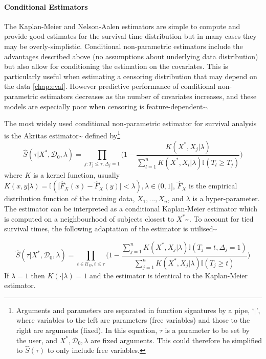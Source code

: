 \documentclass[
  letterpaper,
]{scrbook}
\let\oldparagraph\paragraph
\renewcommand{\paragraph}[1]{\oldparagraph{#1}\mbox{}}
\theoremstyle{plain}
\theoremstyle{definition}
\theoremstyle{remark}
\begin{document}
\paragraph{Conditional Estimators}

The Kaplan-Meier and Nelson-Aalen estimators are simple to compute and
provide good estimates for the survival time distribution but in many
cases they may be overly-simplistic. Conditional non-parametric
estimators include the advantages described above (no assumptions about
underlying data distribution) but also allow for conditioning the
estimation on the covariates. This is particularly useful when
estimating a censoring distribution that may depend on the data
\ref{chap:eval}. However predictive performance of conditional
non-parametric estimators decreases as the number of covariates
increases, and these models are especially poor when censoring is
feature-dependent\textasciitilde{}\cite{Gerds2006}.

The most widely used conditional non-parametric estimator for survival
analysis is the Akritas estimator\textasciitilde{}\cite{Akritas1994}
defined
by\footnote{Arguments and parameters are separated in function signatures by a pipe, `$|$', where variables to the left are parameters (free variables) and those to the right are arguments (fixed). In this equation, $\tau$ is a parameter to be set by the user, and $X^*, \mathcal{D}_0, \lambda$ are fixed arguments. This could therefore be simplified to $\hat{S}(\tau)$ to only include free variables.}
\[
\hat{S}(\tau|X^*, \mathcal{D}_0, \lambda) = \prod_{j:T_j \leq \tau, \Delta_j = 1} \Big(1 - \frac{K(X^*, X_j|\lambda)}{\sum_{l = 1}^n K(X^*, X_l|\lambda)\mathbb{I}(T_l \geq T_j)}\Big)
\] where \(K\) is a kernel function, usually
\(K(x,y|\lambda) = \mathbb{I}(\lvert \hat{F}_X(x) - \hat{F}_X(y)\rvert < \lambda), \lambda \in (0, 1]\),
\(\hat{F}_X\) is the empirical distribution function of the training
data, \(X_1,...,X_n\), and \(\lambda\) is a hyper-parameter. The
estimator can be interpreted as a conditional Kaplan-Meier estimator
which is computed on a neighbourhood of subjects closest to
\(X^*\)\textasciitilde{}\cite{Blanche2013}. To account for tied survival
times, the following adaptation of the estimator is
utilised\textasciitilde{}\cite{Blanche2013}

\[
\label{eq:akritas}
\hat{S}(\tau|X^*, \mathcal{D}_0, \lambda) = \prod_{t \in \mathcal{U}_O, t \leq \tau} \Big(1 - \frac{\sum^n_{j=1} K(X^*,X_j|\lambda)\mathbb{I}(T_j = t, \Delta_j = 1)}{\sum^n_{j=1} K(X^*,X_j|\lambda)\mathbb{I}(T_j \geq t)}\Big)
\] If \(\lambda = 1\) then \(K(\cdot|\lambda) = 1\) and the estimator is
identical to the Kaplan-Meier estimator.
\end{document}
